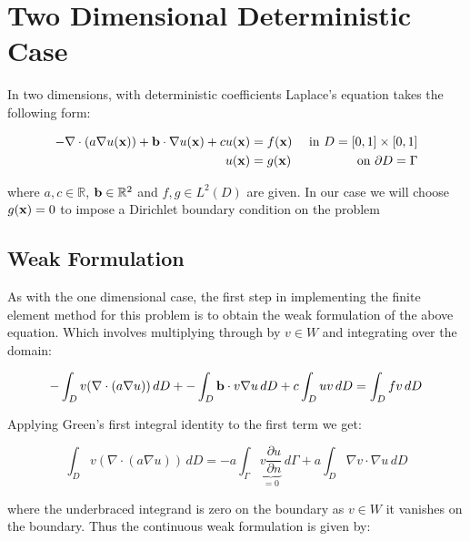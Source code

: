 \chapter{Two Dimensional Deterministic Case}\label{chap:twod-deterministic}

In two dimensions, with deterministic coefficients Laplace's equation takes the
following form:

\begin{equation}\label{eq:two-d-deterministic}
\begin{aligned}
    -\nabla\cdot(a\nabla u(\mathbf{x})) + \mathbf{b} \cdot \nabla u(\mathbf{x}) + c u(\mathbf{x}) &= f(\mathbf{x})
                               &\text{ in } D = [0,1] \times [0,1] \\
    u(\mathbf{x}) &= g(\mathbf{x}) &\text{ on } \partial D = \Gamma
\end{aligned}
\end{equation}

where $a, c \in \mathbb{R}$, $\mathbf{b} \in \mathbb{R}^2$ and $f, g \in L^2(D)$ are
given. In our case we will choose $g(\mathbf{x}) = 0$ to impose a Dirichlet boundary
condition on the problem

\section{Weak Formulation}


As with the one dimensional case, the first step in implementing the finite
element method for this problem is to obtain the weak formulation of the above
equation. Which involves multiplying through by $v \in W$ and integrating over
the domain:

\begin{equation}
    -\int_{D}{v(\nabla\cdot(a\nabla{u}))}\,dD +
    -\int_{D}\mathbf{b}\cdot v\nabla{u}\,dD +
    c\int_{D}uv\,dD = \int_{D}fv\,dD
\end{equation}

Applying Green's first integral identity to the first term we get:

\begin{equation}
    \int_{D}v(\nabla\cdot(a\nabla u))\, dD =
    -a\int_{\Gamma}\underbrace{v\frac{\partial{u}}{\partial{n}}}_{ =0} \,d\Gamma
    + a\int_{D}\nabla{v}\cdot\nabla{u}\,dD
\end{equation}

where the underbraced integrand is zero on the boundary as $v \in W$ it
vanishes on the boundary. Thus the continuous weak formulation is given by:

